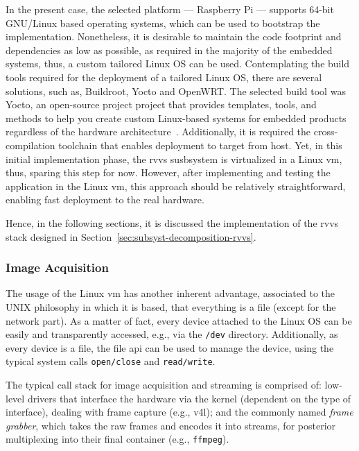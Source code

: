 In the present case, the selected platform --- Raspberry Pi --- supports
64-bit GNU/Linux based operating systems, which can be used to bootstrap the
implementation. Nonetheless, it is desirable to maintain the code footprint and
dependencies as low as possible, as required in the majority of the embedded
systems, thus, a custom tailored Linux OS can be used. Contemplating the build
tools required for the deployment of a tailored Linux OS, there are several
solutions, such as, Buildroot, Yocto and OpenWRT. The selected build tool was
Yocto, an open-source project project that provides templates, tools, and
methods to help you create custom Linux-based systems for embedded products
regardless of the hardware architecture~\cite{yocto2020}. Additionally, it is
required the cross-compilation toolchain that enables deployment to target from
host. Yet, in this initial implementation phase, the \gls{rvvs} susbsystem is
virtualized in a Linux \gls{vm}, thus, sparing this step for now. However, after
implementing and testing the application in the Linux \gls{vm}, this approach
should be relatively straightforward, enabling fast deployment to the real
hardware.

Hence, in the following sections, it is discussed the implementation of the
\gls{rvvs} stack designed in Section~\ref{sec:subsyst-decomposition-rvvs}.
%
\subsubsection{Image Acquisition}%
\label{sec:img-acq-rvvs-implem}
The usage of the Linux \gls{vm} has another inherent advantage, associated to
the UNIX philosophy in which it is based, that everything is a file (except for
the network part). As a matter of fact, every device attached to the Linux OS
can be easily and transparently accessed, e.g., via the \texttt{/dev}
directory. Additionally, as every device is a file, the file \gls{api} can be
used to manage the device, using the typical system calls \texttt{open/close}
and \texttt{read/write}.  

The typical call stack for image acquisition and streaming is comprised of:
low-level drivers that interface the hardware via the kernel (dependent on the
type of interface), dealing with frame capture (e.g., \gls{v4l}); and the
commonly named \emph{frame grabber}, which takes the raw frames and encodes it
into streams, for posterior multiplexing into their final container (e.g.,
\texttt{ffmpeg}).


